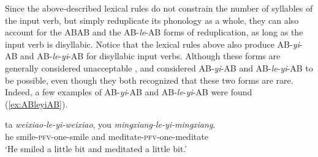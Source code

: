 \documentclass[11pt,a4paper,fleqn,draft]{article}
\newcommand{\type}[1]{{\normalfont\itshape #1\/}}
\newcommand{\phonliste}[1]{%
\mbox{%
$%
%
\left\langle \mbox{\normalfont\itshape#1} \right\rangle%
$%
}%
}
\let\textbf\emph
\begin{document}



Since the above-described lexical rules do not constrain the number of syllables of the input verb, but simply reduplicate its phonology  as a whole,
they can also account for the ABAB and the AB-\emph{le}-AB forms of reduplication,
as long as the input verb is disyllabic.
Notice that  the lexical rules above also produce AB-\emph{yi}-AB and AB\hyp{}\emph{le}\hyp{}\emph{yi}\hyp{}AB for disyllabic input verbs.
Although these forms are generally considered unacceptable \citetext{\citealp[160]{BascianoMelloni2017}, \citealp[275--276]{Hong1999}, \citealp[30]{LiThompson1981}, \citealp[239]{YangWei2017}}, 
\citet[269]{Fan1964} and \citet[143]{Sui2018} considered AB-\emph{yi}-AB and AB-\emph{le}-\emph{yi}-AB to be possible, even though they both recognized that these two forms are rare.
Indeed, a few examples of AB-\emph{yi}-AB and AB-\emph{le}-\emph{yi}-AB were found (\ref{ex:ABleyiAB}).

\ea\label{ex:ABleyiAB}
 
 
 \ea\label{ex:AByiAB-rou2}
 \gll ta \textbf{weixiao-le-yi-weixiao}, you \textbf{mingxiang-le-yi-mingxiang}.\footnotemark\\
 he smile-\textsc{pfv}-one-smile and meditate-\textsc{pfv}-one-meditate\\
 \glt `He smiled a little bit and meditated a little bit.'
 
\end{document}
